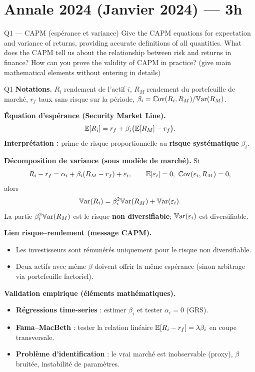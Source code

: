\section{Annale 2024 (Janvier 2024) --- 3h}

\begin{questionbox}{Q1 --- CAPM (espérance et variance)}
Give the CAPM equations for expectation and variance of returns, providing accurate definitions of all quantities. What does the CAPM tell us about the relationship between risk and returns in finance? How can you prove the validity of CAPM in practice? (give main mathematical elements without entering in details)
\end{questionbox}

\begin{solutionbox}{Q1}
\textbf{Notations.} $R_i$ rendement de l'actif $i$, $R_M$ rendement du portefeuille de marché, $r_f$ taux sans risque sur la période, $\beta_i=\mathbb{C}\mathrm{ov}(R_i,R_M)/\mathbb{V}\mathrm{ar}(R_M)$.

\medskip
\textbf{Équation d'espérance (Security Market Line).}
\[
\mathbb{E}[R_i] = r_f + \beta_i\big(\mathbb{E}[R_M]-r_f\big).
\]
\textbf{Interprétation :} prime de risque proportionnelle au \textbf{risque systématique} $\beta_i$.

\medskip
\textbf{Décomposition de variance (sous modèle de marché).} Si
\[
R_i-r_f = \alpha_i + \beta_i(R_M-r_f)+\varepsilon_i,\qquad \E[\varepsilon_i]=0,\ \Cov(\varepsilon_i,R_M)=0,
\]
alors
\[
\mathbb{V}\mathrm{ar}(R_i) = \beta_i^2\mathbb{V}\mathrm{ar}(R_M)+\mathbb{V}\mathrm{ar}(\varepsilon_i).
\]
La partie $\beta_i^2\mathbb{V}\mathrm{ar}(R_M)$ est le risque \textbf{non diversifiable}; $\mathbb{V}\mathrm{ar}(\varepsilon_i)$ est diversifiable.

\medskip
\textbf{Lien risque--rendement (message CAPM).}
\begin{itemize}[leftmargin=*]
  \item Les investisseurs sont rémunérés uniquement pour le risque non diversifiable.
  \item Deux actifs avec même $\beta$ doivent offrir la même espérance (sinon arbitrage via portefeuille factoriel).
\end{itemize}

\medskip
\textbf{Validation empirique (éléments mathématiques).}
\begin{itemize}[leftmargin=*]
  \item \textbf{Régressions time-series} : estimer $\beta_i$ et tester $\alpha_i=0$ (GRS).
  \item \textbf{Fama--MacBeth} : tester la relation linéaire $\mathbb{E}[R_i-r_f]=\lambda \beta_i$ en coupe transversale.
  \item \textbf{Problème d'identification} : le vrai marché est inobservable (proxy), $\beta$ bruitée, instabilité de paramètres.
\end{itemize}
\end{solutionbox}

